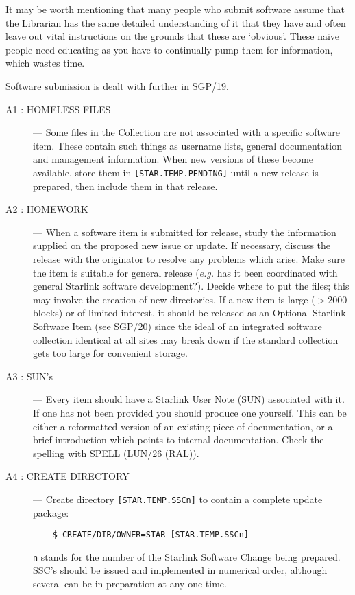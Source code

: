 It may be worth mentioning that many people who submit software assume that the
Librarian has the same detailed understanding of it that they have and often
leave out vital instructions on the grounds that these are `obvious'.
These naive people need educating as you have to continually pump them for
information, which wastes time.

Software submission is dealt with further in SGP/19.

\begin{description}

\item [A1 : HOMELESS FILES] ---
Some files in the Collection are not associated with a specific software item.
These contain such things as username lists, general documentation and
management information.
When new versions of these become available, store them in
{\tt [STAR.TEMP.PENDING]} until a new release is prepared, then include them
in that release.

\item [A2 : HOMEWORK] ---
When a software item is submitted for release, study the information supplied
on the proposed new issue or update.
If necessary, discuss the release with the originator to resolve any problems
which arise.
Make sure the item is suitable for general release ({\em e.g.} has it been
coordinated with general Starlink software development?).
Decide where to put the files; this may involve the creation of new directories.
If a new item is large ($>$2000 blocks) or of limited interest, it should be
released as an Optional Starlink Software Item (see SGP/20) since the ideal
of an integrated software collection identical at all sites may break down if
the standard collection gets too large for convenient storage.

\item [A3 : SUN's] ---
Every item should have a Starlink User Note (SUN) associated with it.
If one has not been provided you should produce one yourself.
This can be either a reformatted version of an existing piece of documentation,
or a brief introduction which points to internal documentation.
Check the spelling with SPELL (LUN/26 (RAL)).

\item [A4 : CREATE DIRECTORY] ---
Create directory {\tt [STAR.TEMP.SSCn]} to contain a complete update package:
\begin{verbatim}
    $ CREATE/DIR/OWNER=STAR [STAR.TEMP.SSCn]
\end{verbatim}
{\tt n} stands for the number of the Starlink Software Change being prepared.
SSC's should be issued and implemented in numerical order, although several
can be in preparation at any one time.


\end{description}
